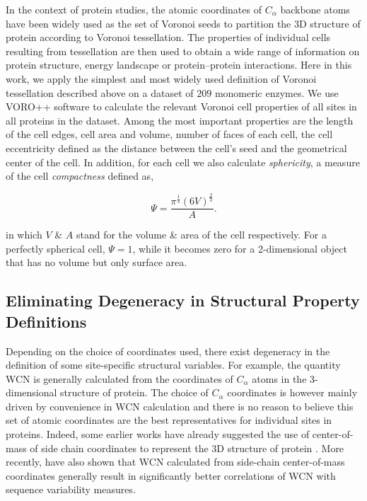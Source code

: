 \documentclass[11pt]{article}
\begin{document}
        In the context of protein studies, the atomic coordinates of $C_\alpha$ backbone atoms have been widely used as the set of Voronoi seeds to partition the 3D structure of protein according to Voronoi tessellation. The properties of individual cells resulting from tessellation are then used to obtain a wide range of information on protein structure, energy landscape or protein--protein interactions. Here in this work, we apply the simplest and most widely used definition of Voronoi tessellation described above on a dataset of $209$  monomeric enzymes. We use VORO++ software \citep[][]{rycroft_voro++:_2009} to calculate the relevant Voronoi cell properties of all sites in all proteins in the dataset. Among the most important properties are the length of the cell edges, cell area and volume, number of faces of each cell, the cell eccentricity defined as the distance between the cell's seed and the geometrical center of the cell. In addition, for each cell we also calculate {\it sphericity}, a measure of the cell {\it compactness} defined as,

        \begin{equation}
        \label{eqn:sphericity}
        \Psi = \frac{\pi^{\frac{1}{3}}(6V)^{\frac{2}{3}}}{A}.
        \end{equation}

        in which $V$ \& $A$ stand for the volume \& area of the cell respectively. For a perfectly spherical cell, $\Psi=1$, while it becomes zero for a 2-dimensional object that has no volume but only surface area.

    \subsection*{Eliminating Degeneracy in Structural Property Definitions}

        Depending on the choice of coordinates used, there exist degeneracy in the definition of some site-specific structural variables. For example, the quantity WCN is generally calculated from the coordinates of $C_\alpha$ atoms in the 3-dimensional structure of protein. The choice of $C_\alpha$ coordinates is however mainly driven by convenience in WCN calculation and there is no reason to believe this set of atomic coordinates are the best representatives for individual sites in proteins. Indeed, some earlier works have already suggested the use of center-of-mass of side chain coordinates to represent the 3D structure of protein \citep[e.g., ][]{soyer_voronoi_2000}. More recently, \citet{marcos_too_2014} have also shown that WCN calculated from side-chain center-of-mass coordinates generally result in significantly better correlations of WCN with sequence variability measures.\\
\end{document}

